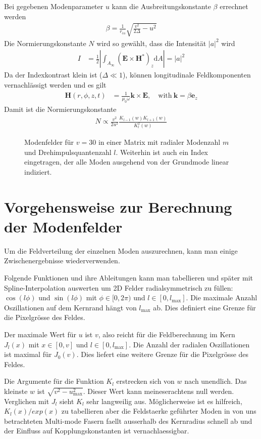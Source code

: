 \documentclass[DIV19,twocolumn]{scrartcl}
\newcommand{\vect}[1]{\mathbf{#1}}
\def\k{\vect k}
\def\e{\vect e}
\def\E{\vect E}
\def\H{\vect H}
\def\({\left(}
\def\){\right)}
\newcommand{\rco}{r_\textrm{co}}
\newcommand{\lmax}{l_\textrm{max}}
\newcommand{\umax}{u_\textrm{max}}
\def\svgending{\ifx\pdfoutput\undefined%
  .eps_tex%
  \else%
  .pdf_tex%
  \fi}
\newcommand{\svginput}[2]{{\def\svgscale{#1}}}
\begin{document}
Bei gegebenen Modenparameter $u$ kann die Ausbreitungskonstante
$\beta$ errechnet werden
\begin{align}
\beta = \frac{1}{\rco} \sqrt{\frac{v^2}{2\Delta} - u^2}
\end{align}
Die Normierungskonstante $N$ wird so gew\"ahlt, dass die Intensit\"at
$|a|^2$ wird
\begin{align}
  I &= \frac{1}{2}\left|\int_{A_\infty} \(\E\times\H^*\)_z  \textrm{d}A \right| = |a|^2
\end{align}
Da der Indexkontrast klein ist ($\Delta \ll 1$), k\"onnen longitudinale Feldkomponenten vernachl\"assigt werden und es gilt
\begin{align}
  \H(r,\phi,z,t) &= \frac{1}{\mu_0 \omega} \k \times \E, \quad\textrm{with}\ \k = \beta \e_z
\end{align}
Damit ist die Normierungskonstante 
\begin{align}
  N \propto \frac{v^2}{2 u^2} \frac{K_{l-1}(w)K_{l+1}(w)}{K_l^2(w)}
\end{align}

\begin{figure}[hbtp]
  \centering
  \svginput{1}{modes}
  \caption{Modenfelder f\"ur $v=30$ in einer Matrix mit radialer
    Modenzahl $m$ und Drehimpulsquantenzahl $l$. Weiterhin ist auch
    ein Index eingetragen, der alle Moden ausgehend von der Grundmode
    linear indiziert.}
  \label{fig:fields}
\end{figure}
\section{Vorgehensweise zur Berechnung der Modenfelder}
Um die Feldverteilung der einzelnen Moden auszurechnen, kann man
einige Zwischenergebnisse wiederverwenden.

Folgende Funktionen und ihre Ableitungen kann man tabellieren und
sp\"ater mit Spline-Interpolation auswerten um 2D Felder
radialsymmetrisch zu f\"ullen: $\cos(l\phi)$ und $\sin(l\phi)$ mit
$\phi\in[0,2\pi)$ und $l\in[0,\lmax]$. Die maximale Anzahl
  Oszillationen auf dem Kernrand h\"angt von $\lmax$ ab. Dies
  definiert eine Grenze f\"ur die Pixelgr\"osse des Feldes.

Der maximale Wert f\"ur $u$ ist $v$, also reicht f\"ur die
Feldberechnung im Kern $J_l(x)$ mit $x\in[0,v]$ und $l\in[0,\lmax]$.
Die Anzahl der radialen Oszillationen ist maximal f\"ur $J_0(v)$. Dies
liefert eine weitere Grenze f\"ur die Pixelgr\"osse des Feldes.

Die Argumente f\"ur die Funktion $K_l$ erstrecken sich von $w$ nach
unendlich. Das kleinste $w$ ist $\sqrt{v^2-\umax^2}$. Dieser Wert kann
meineserachtens null werden. Verglichen mit $J_l$ sieht $K_l$ sehr
langweilig aus. M\"oglicherweise ist es hilfreich, $K_l(x)/exp(x)$ zu
tabellieren aber die Feldstaerke gef\"uhrter Moden in von uns
betrachteten Multi-mode Fasern faellt ausserhalb des Kernradius
schnell ab und der Einfluss auf Kopplungskonstanten ist
vernachlaessigbar.
\end{document}
